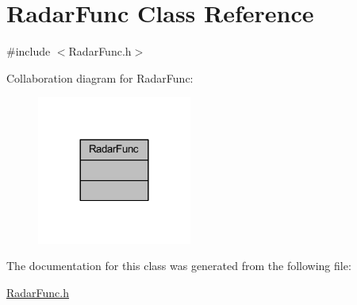 \hypertarget{class_radar_func}{}\section{Radar\+Func Class Reference}
\label{class_radar_func}


{\ttfamily \#include $<$Radar\+Func.\+h$>$}



Collaboration diagram for Radar\+Func\+:
\nopagebreak
\begin{figure}[H]
\begin{center}
\leavevmode
\includegraphics[width=144pt]{class_radar_func__coll__graph}
\end{center}
\end{figure}


The documentation for this class was generated from the following file\+:\begin{DoxyCompactItemize}
\item 
\mbox{\hyperlink{_radar_func_8h}{Radar\+Func.\+h}}\end{DoxyCompactItemize}
